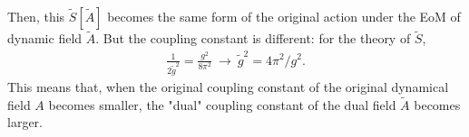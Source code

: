 \documentclass{ltjsarticle}
\theoremstyle{mystyle} %
\numberwithin{equation}{section}
\begin{document}
Then, this $\tilde{S}[\tilde{A}]$ becomes the same form of the original action under the EoM of dynamic field $\tilde{A}$. 
But the coupling constant is different: for the theory of $\tilde{S}$, 
\begin{align}
    \frac{1}{2\tilde{g}^2} = \frac{g^2}{8\pi^2} ~\to~\tilde{g}^2 = 4\pi^2 / g^2.  
\end{align}
This means that, when the original coupling constant of the original dynamical field $A$ becomes smaller, 
the "dual" coupling constant of the dual field $\tilde{A}$ becomes larger. \\\\
\end{document}
